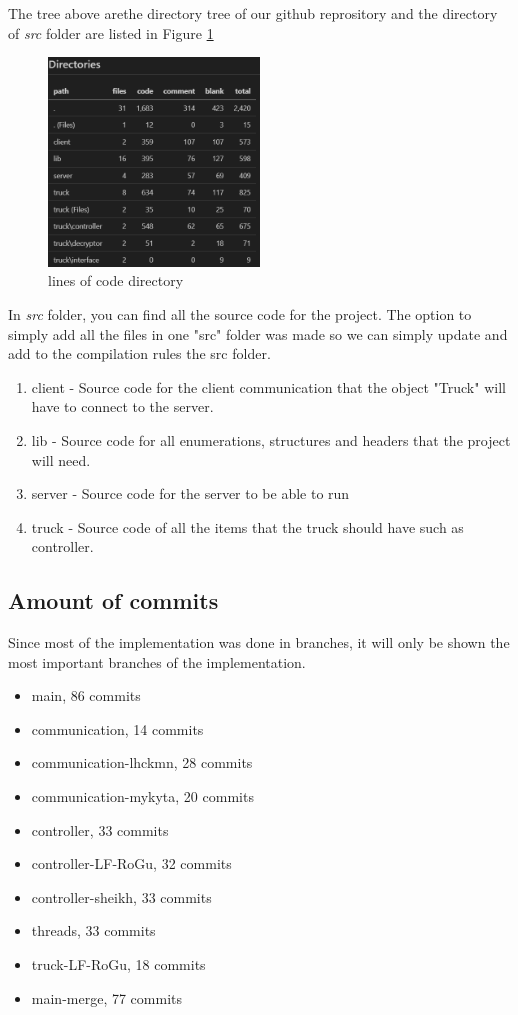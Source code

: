 The tree above arethe directory tree of our github reprository and the directory of \textit{src} folder are listed in Figure \ref{img:lines_of_code_directory}
\begin{figure}[ht]
    \centering
    \includegraphics[width=0.5\textwidth]
   {images/lines_of_code_directory.png}
    \caption{lines of code directory}
    \label{img:lines_of_code_directory}
\end{figure}

In \textit{src} folder, you can find all the source code for the project. The option to simply add all the files in one "src" folder was made so we can simply update and add to the compilation rules the src folder.
\begin{enumerate}
    \item client - Source code for the client communication that the object "Truck" will have to connect to the server.
    \item lib - Source code for all enumerations, structures and headers that the project will need.
    \item server - Source code for the server to be able to run
    \item truck - Source code of all the items that the truck should have such as controller.
\end{enumerate}

\subsection{Amount of commits}
Since most of the implementation was done in branches, it will only be shown the most important branches of the implementation.
\begin{itemize}
    \item main, 86 commits
    \item communication, 14 commits
    \item communication-lhckmn, 28 commits
    \item communication-mykyta, 20 commits
    \item controller, 33 commits
    \item controller-LF-RoGu, 32 commits
    \item controller-sheikh, 33 commits
    \item threads, 33 commits
    \item truck-LF-RoGu, 18 commits
    \item main-merge, 77 commits
\end{itemize}
